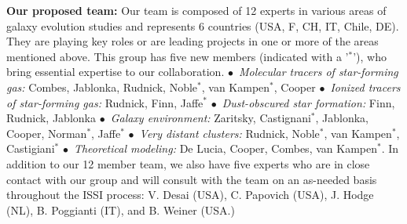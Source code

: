 \documentclass[11pt]{article}
\begin{document}

\textbf{Our proposed team:} Our team is composed of 12 experts in various areas of galaxy evolution studies and
represents 6 countries (USA, F, CH, IT, Chile, DE).  They are playing key roles or are leading
projects in one or more of the areas mentioned
above. This group has five new members (indicated with a '$^*$'), who bring essential expertise to our collaboration.  $\bullet$~\textit{Molecular tracers of star-forming gas:} Combes, Jablonka, Rudnick, Noble$^*$, van Kampen$^*$, Cooper
$\bullet$~\textit{Ionized tracers of star-forming gas:} Rudnick, Finn, Jaffe$^*$
 $\bullet$~\textit{Dust-obscured star formation:} Finn, Rudnick, Jablonka
$\bullet$~\textit{Galaxy environment:}  Zaritsky, Castignani$^*$, Jablonka, Cooper, Norman$^*$, Jaffe$^*$ $\bullet$~\textit{Very distant clusters:} Rudnick, Noble$^*$, van Kampen$^*$, Castigiani$^*$ $\bullet$~\textit{Theoretical modeling:} De Lucia, Cooper, Combes, van Kampen$^*$.  In addition to our 12 member team, we also have five experts who are in close contact with our group and will consult with the team on an as-needed basis throughout the ISSI process: V. Desai (USA), C. Papovich (USA), J. Hodge (NL), B. Poggianti (IT), and B. Weiner (USA.)
\end{document}
